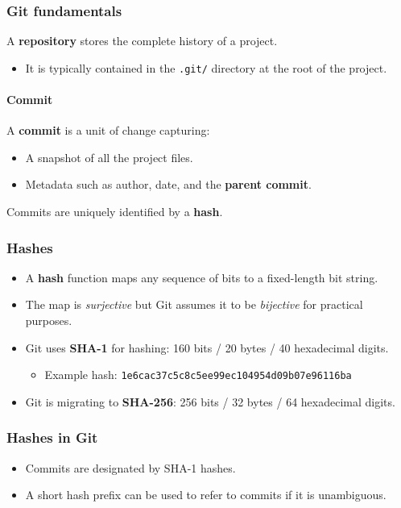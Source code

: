 \documentclass[12pt]{article}
\begin{document}
\subsubsection{Git fundamentals}
A \textbf{repository} stores the complete history of a project.
\begin{itemize}
    \item It is typically contained in the \texttt{.git/} directory at the root of the project.
\end{itemize}

\paragraph{Commit}
A \textbf{commit} is a unit of change capturing:
\begin{itemize}
    \item A snapshot of all the project files.
    \item Metadata such as author, date, and the \textbf{parent commit}.
\end{itemize}
Commits are uniquely identified by a \textbf{hash}.

\subsubsection{Hashes}
\begin{itemize}
    \item A \textbf{hash} function maps any sequence of bits to a fixed-length bit string.
    \item The map is \textit{surjective} but Git assumes it to be \textit{bijective} for practical purposes.
    \item Git uses \textbf{SHA-1} for hashing: 160 bits / 20 bytes / 40 hexadecimal digits.
    \begin{itemize}
        \item Example hash: \texttt{1e6cac37c5c8c5ee99ec104954d09b07e96116ba}
    \end{itemize}
    \item Git is migrating to \textbf{SHA-256}: 256 bits / 32 bytes / 64 hexadecimal digits.
\end{itemize}

\subsubsection{Hashes in Git}
\begin{itemize}
    \item Commits are designated by SHA-1 hashes.
    \item A short hash prefix can be used to refer to commits if it is unambiguous.
\end{itemize}
\end{document}
